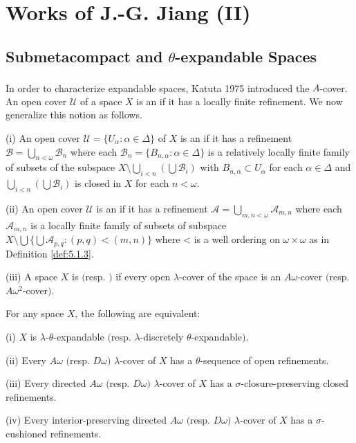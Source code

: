\documentclass[main.tex]{subfiles}
\begin{document}
	
\chapter{Works of J.-G. Jiang (II)} 
	\label{ch6}

\section{Submetacompact and $\theta$-expandable Spaces} \label{sec:6.1}

In order to characterize expandable spaces, \hstretch{1.8}{[}Katuta 1975\hstretch{1.8}{]}\textsuperscript{\cite{Katuta1975}}
introduced the $A$-cover. An open cover $\mathscr{U}$ of a space $X$ is an 
 if it has a 
locally finite refinement. We now generalize this notion as follows.

{ 
\textup{(i)} An open cover $\mathscr{U} = \{U_\alpha: \alpha \in \Delta\}$ of $X$ 
is an 
if it has a refinement 
$\mathscr{B} = \bigcup_{n<\omega} \mathscr{B}_n$ 
where each $\mathscr{B}_n = \{B_{n,\alpha}: \alpha \in \Delta\}$ 
is a relatively locally finite family of subsets of the subspace 
$X \setminus \bigcup_{i<n} (\bigcup \mathscr{B}_i)$ with 
$B_{n,\alpha} \subset U_\alpha$ for each $\alpha \in \Delta$ 
and  
$\bigcup_{i<n} (\bigcup \mathscr{B}_i)$ is closed in $X$ for each $n < \omega$.

\textup{(ii)} An open cover $\mathscr{U}$ is an 
if it has a refinement 
$\mathscr{A} = \bigcup_{m,n<\omega} \mathscr{A}_{m,n}$ 
where each $\mathscr{A}_{m,n}$ is a locally finite family of subsets of subspace 
$X \setminus \bigcup\{\bigcup \mathscr{A}_{p,q}: (p,q)< (m,n)\}$
where < is a well ordering on 
$\omega\times\omega$ as in Definition \ref{def:5.1.3}.

\textup{(iii)} A space $X$ is 
$($resp. $)$
if every open  $\lambda$-cover of the space is an $A\omega$-cover
$($resp. $A\omega^2$-cover$)$.
}

{\theorem{} \label{th:6.1.2}
For any space $X$, the following are equivalent:

\textup{(i)} $X$ is $\lambda$-$\theta$-expandable $($resp. $\lambda$-discretely $\theta$-expandable$)$. 

\textup{(ii)} Every $A\omega$ $($resp. $D\omega)$ $\lambda$-cover of $X$ has
a $\theta$-sequence of open refinements.

\textup{(iii)} Every directed $A\omega$ $($resp. $D\omega)$ $\lambda$-cover of $X$ has
a $\sigma$-closure-preserving closed refinements.

\textup{(iv)} Every interior-preserving directed $A\omega$ $($resp. $D\omega)$ $\lambda$-cover of 
$X$ has a $\sigma$-cushioned refinements.
}
\end{document}
